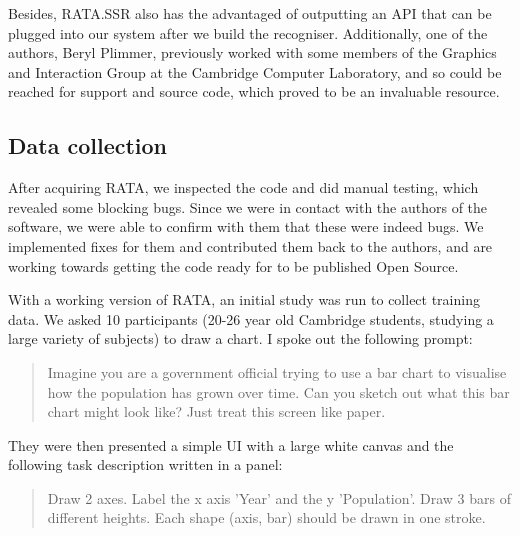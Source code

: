 	Besides, RATA.SSR also has the advantaged of outputting an API that can be plugged into our system after we build the recogniser. Additionally, one of the authors, Beryl Plimmer, previously worked with some members of the Graphics and Interaction Group at the Cambridge Computer Laboratory, and so could be reached for support and source code, which proved to be an invaluable resource.
	
	\subsection{Data collection}
	After acquiring RATA, we inspected the code and did manual testing, which revealed some blocking bugs. Since we were in contact with the authors of the software, we were able to confirm with them that these were indeed bugs. We implemented fixes for them and contributed them back to the authors, and are working towards getting the code ready for to be published Open Source.
	
	With a working version of RATA, an initial study was run to collect training data. We asked 10 participants (20-26 year old Cambridge students, studying a large variety of subjects) to draw a chart. I spoke out the following prompt:
	
	\begin{quotation}
	Imagine you are a government official trying to use a bar chart to visualise how the population has grown over time. Can you sketch out what this bar chart might look like? Just treat this screen like paper.
	\end{quotation}
	
	 They were then presented a simple UI with a large white canvas and the following task description written in a panel:
	
	\begin{quotation}
	Draw 2 axes. Label the x axis 'Year' and the y 'Population'. Draw 3 bars of different heights. Each shape (axis, bar) should be drawn in one stroke.
	\end{quotation}
	
%	
%	
%
%	
	
